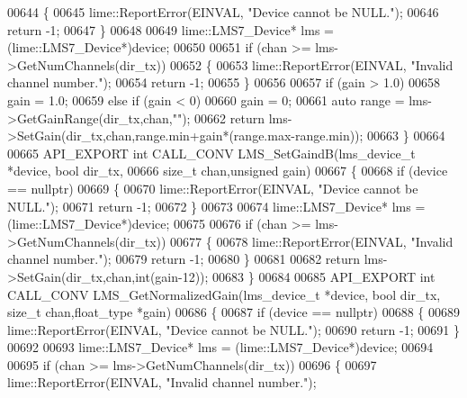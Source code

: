 \begin{DoxyCode}
00644     \{
00645         lime::ReportError(EINVAL, \textcolor{stringliteral}{"Device cannot be NULL."});
00646         \textcolor{keywordflow}{return} -1;
00647     \}
00648 
00649     lime::LMS7_Device* lms = (lime::LMS7_Device*)device;
00650 
00651     \textcolor{keywordflow}{if} (chan >= lms->GetNumChannels(dir\_tx))
00652     \{
00653         lime::ReportError(EINVAL, \textcolor{stringliteral}{"Invalid channel number."});
00654         \textcolor{keywordflow}{return} -1;
00655     \}
00656 
00657     \textcolor{keywordflow}{if} (gain > 1.0)
00658         gain = 1.0;
00659     \textcolor{keywordflow}{else} \textcolor{keywordflow}{if} (gain < 0)
00660         gain = 0;
00661    \textcolor{keyword}{auto} range = lms->GetGainRange(dir\_tx,chan,\textcolor{stringliteral}{""});
00662    \textcolor{keywordflow}{return} lms->SetGain(dir\_tx,chan,range.min+gain*(range.max-range.min));
00663 \}
00664 
00665 API_EXPORT \textcolor{keywordtype}{int} CALL_CONV LMS_SetGaindB(lms_device_t *device, \textcolor{keywordtype}{bool} dir_tx,
00666                                                 \textcolor{keywordtype}{size\_t} chan,\textcolor{keywordtype}{unsigned} gain)
00667 \{
00668     \textcolor{keywordflow}{if} (device == \textcolor{keyword}{nullptr})
00669     \{
00670         lime::ReportError(EINVAL, \textcolor{stringliteral}{"Device cannot be NULL."});
00671         \textcolor{keywordflow}{return} -1;
00672     \}
00673 
00674     lime::LMS7_Device* lms = (lime::LMS7_Device*)device;
00675 
00676     \textcolor{keywordflow}{if} (chan >= lms->GetNumChannels(dir\_tx))
00677     \{
00678         lime::ReportError(EINVAL, \textcolor{stringliteral}{"Invalid channel number."});
00679         \textcolor{keywordflow}{return} -1;
00680     \}
00681 
00682    \textcolor{keywordflow}{return} lms->SetGain(dir\_tx,chan,\textcolor{keywordtype}{int}(gain-12));
00683 \}
00684 
00685 API_EXPORT \textcolor{keywordtype}{int} CALL_CONV LMS_GetNormalizedGain(lms_device_t *device, \textcolor{keywordtype}{bool} dir_tx, \textcolor{keywordtype}{size\_t} 
      chan,float_type *gain)
00686 \{
00687     \textcolor{keywordflow}{if} (device == \textcolor{keyword}{nullptr})
00688     \{
00689         lime::ReportError(EINVAL, \textcolor{stringliteral}{"Device cannot be NULL."});
00690         \textcolor{keywordflow}{return} -1;
00691     \}
00692 
00693     lime::LMS7_Device* lms = (lime::LMS7_Device*)device;
00694 
00695     \textcolor{keywordflow}{if} (chan >= lms->GetNumChannels(dir\_tx))
00696     \{
00697         lime::ReportError(EINVAL, \textcolor{stringliteral}{"Invalid channel number."});

\end{DoxyCode}

